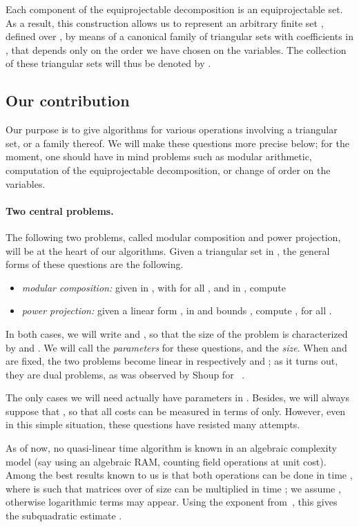 \documentclass[12pt]{article}
\begin{document}
Each component of the equiprojectable decomposition is an
equiprojectable set. As a result, this construction allows us to
represent an arbitrary finite set , defined over , by means of
a canonical family of triangular sets with coefficients in , that
depends only on the order  we have chosen on the variables. The
collection of these triangular sets will thus be denoted by
.



\subsection{Our contribution}

Our purpose is to give algorithms for various operations involving a
triangular set, or a family thereof. We will make these questions more
precise below; for the moment, one should have in mind problems such
as modular arithmetic, computation of the equiprojectable
decomposition, or change of order on the variables.

\paragraph{Two central problems.}
The following two problems, called modular composition and power
projection, will be at the heart of our algorithms.  Given a
triangular set  in , the general forms of
these questions are the following.
\begin{itemize}
\item {\em modular composition:} given  in ,
  with  for all , and  in
  , compute 
\item {\em power projection:} given a linear form ,
   in  and bounds , compute
  , for all .
\end{itemize}
In both cases, we will write  and
, so that the size of the problem is
characterized by  and . We will call
 the {\em parameters} for these questions, and
 the {\em size}. When  and
 are fixed, the two problems become linear in
respectively  and ; as it turns out, they are dual problems,
as was observed by Shoup for ~\cite{Shoup94}.

The only cases we will need actually have parameters  in
.  Besides, we will always suppose that , so that all costs can be measured in terms of
 only. However, even in this simple situation, these
questions have resisted many attempts.

As of now, no quasi-linear time algorithm is known in an algebraic
complexity model (say using an algebraic RAM, counting field
operations at unit cost). Among the best results known to us is that
both operations can be done in time ,
where  is such that matrices over  of size  can be
multiplied in time ; we assume , otherwise
logarithmic terms may appear. Using the exponent 
from~\cite{CoWi90}, this gives the subquadratic estimate
.
\end{document}
